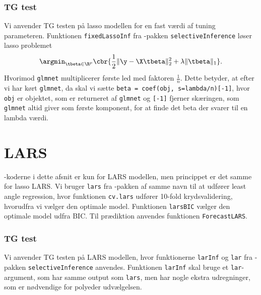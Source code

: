 \subsubsection{TG test} 
Vi anvender TG testen på lasso modellen for en fast værdi af tuning parameteren. 
Funktionen \texttt{fixedLassoInf} fra \Rlang-pakken \texttt{selectiveInference}  løser lasso problemet
\begin{align*}
\argmin_{\tbeta \in \R^p} \cbr{\frac{1}{2} \Vert \y - \X \tbeta \Vert_2^2 + \lambda \Vert \tbeta \Vert_1}.
\end{align*}
Hvorimod \texttt{glmnet} multiplicerer første led med faktoren \(\frac{1}{n}\).
Dette betyder, at efter vi har kørt \texttt{glmnet}, da skal vi sætte \texttt{beta = coef(obj, s=lambda/n)[-1]}, hvor \texttt{obj} er objektet, som er returneret af \texttt{glmnet} og \texttt{[-1]} fjerner skæringen, som \texttt{glmnet} altid giver som første komponent, for at finde det beta der svarer til en lambda værdi.
%
%

\section{LARS} \label{sec:apprkoderlars}
\Rlang-koderne i dette afsnit er kun for LARS modellen, men princippet er det samme for lasso LARS.
Vi bruger \texttt{lars} fra  \Rlang-pakken af samme navn til at udfører least angle regression, hvor funktionen \texttt{cv.lars} udfører 10-fold krydsvalidering, hvorudfra vi vælger den optimale model. 
Funktionen \texttt{larsBIC} vælger den optimale model udfra BIC. 
Til prædiktion anvendes funktionen \texttt{ForecastLARS}.

\subsubsection{TG test} \label{subsubsec:inferens}
Vi anvender TG testen på LARS modellen, hvor funktionerne \texttt{larInf} og \texttt{lar} fra \Rlang-pakken \texttt{selectiveInference} anvendes. 
Funktionen \texttt{larInf} skal bruge et \texttt{lar}-argument, som har samme output som \texttt{lars}, men har nogle ekstra udregninger, som er nødvendige for polyeder udvælgelsen. 



